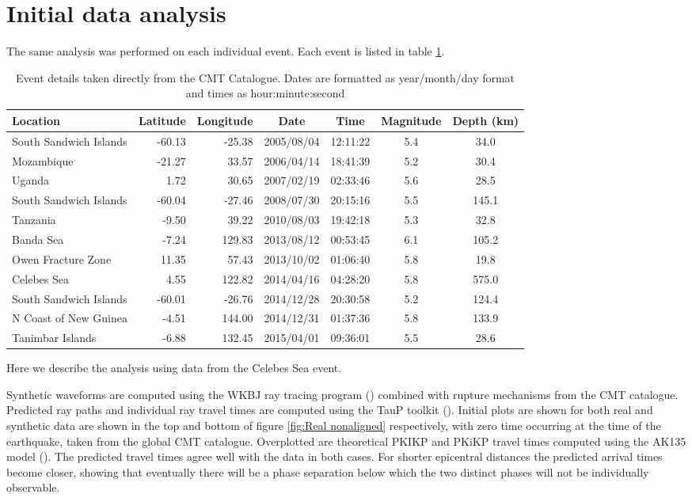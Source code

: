 \documentclass[11pt,a4paper]{article}
\begin{document}
\section{Initial data analysis}
\label{sec:Initial analysis}
The same analysis was performed on each individual event. Each event is listed in table \ref{tab:Events}.
\begin{table}\footnotesize
\centering
\begin{tabular}{| l | r | r | c | c | c | c |}
	\hline Location				& Latitude	& Longitude	& Date		& Time		& Magnitude	& Depth (km) 	\\ \hline
	\hline South Sandwich Islands	& -60.13	& -25.38		& 2005/08/04	& 12:11:22	& 5.4			& 34.0		\\
	\hline Mozambique			& -21.27	& 33.57		& 2006/04/14	& 18:41:39	& 5.2			& 30.4		\\
	\hline Uganda				& 1.72	& 30.65		& 2007/02/19	& 02:33:46	& 5.6			& 28.5		\\
	\hline South Sandwich Islands	& -60.04	& -27.46		& 2008/07/30	& 20:15:16	& 5.5			& 145.1		\\
	\hline Tanzania				& -9.50	& 39.22		& 2010/08/03	& 19:42:18	& 5.3			& 32.8		\\
	\hline Banda Sea			& -7.24	& 129.83		& 2013/08/12	& 00:53:45	& 6.1			& 105.2		\\
	\hline Owen Fracture Zone	& 11.35	& 57.43		& 2013/10/02	& 01:06:40	& 5.8			& 19.8		\\
	\hline Celebes Sea			& 4.55	& 122.82		& 2014/04/16	& 04:28:20	& 5.8			& 575.0  		\\ 
	\hline South Sandwich Islands 	& -60.01	& -26.76		& 2014/12/28	& 20:30:58	& 5.2			& 124.4		\\
	\hline N Coast of New Guinea	& -4.51	& 144.00		& 2014/12/31	& 01:37:36	& 5.8			& 133.9		\\
	\hline Tanimbar Islands		& -6.88	& 132.45		& 2015/04/01	& 09:36:01	& 5.5			& 28.6		\\
	\hline	
\end{tabular}
\caption{Event details taken directly from the CMT Catalogue. Dates are formatted as year/month/day format and times as hour:minute:second}
\label{tab:Events}
\end{table}
Here we describe the analysis using data from the Celebes Sea event.

Synthetic waveforms are computed using the WKBJ ray tracing program (\cite{Chapman1976}) combined with rupture mechanisms from the CMT catalogue. Predicted ray paths and individual ray travel times are computed using the TauP toolkit (\cite{Crotwell1999}). Initial plots are shown for both real and synthetic data are shown in the top and bottom of figure \ref{fig:Real nonaligned} respectively, with zero time occurring at the time of the earthquake, taken from the global CMT catalogue. Overplotted are theoretical PKIKP and PKiKP travel times computed using the AK135 model (\cite{Kennett1995b}). The predicted travel times agree well with the data in both cases.  For shorter epicentral distances the predicted arrival times become closer, showing that eventually there will be a phase separation below which the two distinct phases will not be individually observable.
\end{document}
